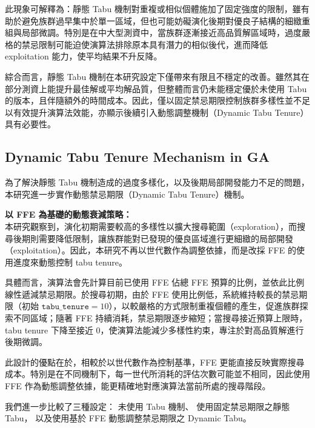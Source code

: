 \documentclass[conference]{IEEEtran}
\begin{document}
此現象可解釋為：靜態 Tabu 機制對重複或相似個體施加了固定強度的限制，雖有助於避免族群過早集中於單一區域，但也可能妨礙演化後期對優良子結構的細緻重組與局部微調。特別是在中大型測資中，當族群逐漸接近高品質解區域時，過度嚴格的禁忌限制可能迫使演算法排除原本具有潛力的相似後代，進而降低 exploitation 能力，使平均結果不升反降。

綜合而言，靜態 Tabu 機制在本研究設定下僅帶來有限且不穩定的改善。雖然其在部分測資上能提升最佳解或平均解品質，但整體而言仍未能穩定優於未使用 Tabu 的版本，且伴隨額外的時間成本。因此，僅以固定禁忌期限控制族群多樣性並不足以有效提升演算法效能，亦顯示後續引入動態調整機制（Dynamic Tabu Tenure）具有必要性。


\subsection{Dynamic Tabu Tenure Mechanism in GA}
為了解決靜態 Tabu 機制造成的過度多樣化，以及後期局部開發能力不足的問題，本研究進一步實作動態禁忌期限（Dynamic Tabu Tenure）機制。

\textbf{以 FFE 為基礎的動態衰減策略：} \\
本研究觀察到，演化初期需要較高的多樣性以擴大搜尋範圍（exploration），而搜尋後期則需要降低限制，讓族群能對已發現的優良區域進行更細緻的局部開發（exploitation）。因此，本研究不再以世代數作為調整依據，而是改採 FFE 的使用進度來動態控制 tabu tenure。

具體而言，演算法會先計算目前已使用 FFE 佔總 FFE 預算的比例，並依此比例線性遞減禁忌期限。於搜尋初期，由於 FFE 使用比例低，系統維持較長的禁忌期限（初始 $\texttt{tabu\_tenure}=10$），以較嚴格的方式限制重複個體的產生，促進族群探索不同區域；隨著 FFE 持續消耗，禁忌期限逐步縮短；當搜尋接近預算上限時，tabu tenure 下降至接近 0，使演算法能減少多樣性約束，專注於對高品質解進行後期微調。

此設計的優點在於，相較於以世代數作為控制基準，FFE 更能直接反映實際搜尋成本。特別是在不同機制下，每一世代所消耗的評估次數可能並不相同，因此使用 FFE 作為動態調整依據，能更精確地對應演算法當前所處的搜尋階段。

我們進一步比較了三種設定：
未使用 Tabu 機制、
使用固定禁忌期限之靜態 Tabu，
以及使用基於 FFE 動態調整禁忌期限之 Dynamic Tabu。
\end{document}
